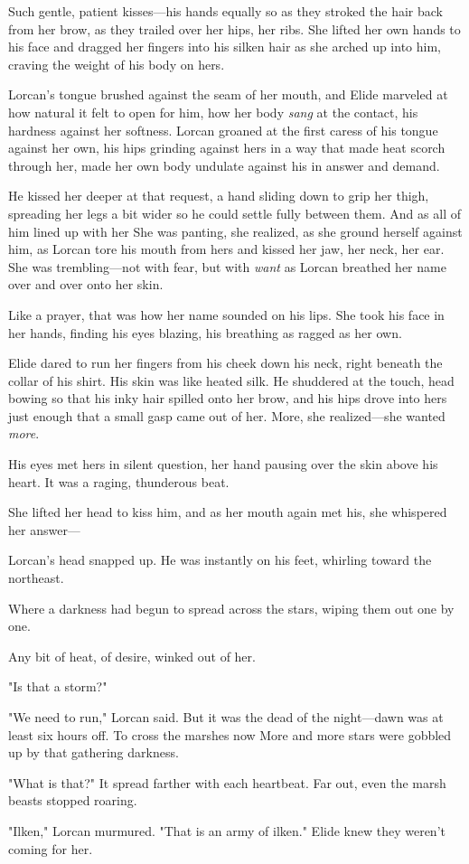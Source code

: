 Such gentle, patient kisses---his hands equally so as they stroked the hair back from her brow, as they trailed over her hips, her ribs. She lifted her own hands to his face and dragged her fingers into his silken hair as she arched up into him, craving the weight of his body on hers.

Lorcan's tongue brushed against the seam of her mouth, and Elide marveled at how natural it felt to open for him, how her body
\emph{sang} at the contact, his hardness against her softness. Lorcan groaned at the first caress of his tongue against her own, his hips grinding against hers in a way that made heat scorch through her, made her own body undulate against his in answer and demand.

He kissed her deeper at that request, a hand sliding down to grip her thigh, spreading her legs a bit wider so he could settle fully between them. And as all of him lined up with her  She was panting, she realized, as she ground herself against him, as Lorcan tore his mouth from hers and kissed her jaw, her neck, her ear. She was trembling---not with fear, but with \emph{want} as Lorcan breathed her name over and over onto her skin.

Like a prayer, that was how her name sounded on his lips. She took his face in her hands, finding his eyes blazing, his breathing as ragged as her own.

Elide dared to run her fingers from his cheek down his neck, right beneath the collar of his shirt. His skin was like heated silk. He shuddered at the touch, head bowing so that his inky hair spilled onto her brow, and his hips drove into hers just enough that a small gasp came out of her. More, she realized---she wanted \emph{more}.

His eyes met hers in silent question, her hand pausing over the skin above his heart. It was a raging, thunderous beat.

She lifted her head to kiss him, and as her mouth again met his, she whispered her answer---

Lorcan's head snapped up. He was instantly on his feet, whirling toward the northeast.

Where a darkness had begun to spread across the stars, wiping them out one by one.

Any bit of heat, of desire, winked out of her.

"Is that a storm?"

"We need to run," Lorcan said. But it was the dead of the night---dawn was at least six hours off. To cross the marshes now  More and more stars were gobbled up by that gathering darkness.

"What is that?" It spread farther with each heartbeat. Far out, even the marsh beasts stopped roaring.

"Ilken," Lorcan murmured. "That is an army of ilken." Elide knew they weren't coming for her.
